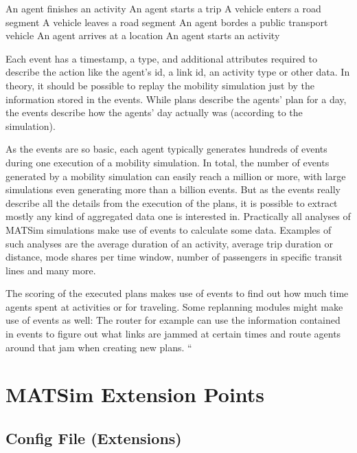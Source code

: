     An agent finishes an activity
    An agent starts a trip
    A vehicle enters a road segment
    A vehicle leaves a road segment
    An agent bordes a public transport vehicle
    An agent arrives at a location
    An agent starts an activity

Each event has a timestamp, a type, and additional attributes required to describe the action like the agent's id, a link id, an activity type or other data. In theory, it should be possible to replay the mobility simulation just by the information stored in the events. While plans describe the agents' plan for a day, the events describe how the agents' day actually was (according to the simulation).

As the events are so basic, each agent typically generates hundreds of events during one execution of a mobility simulation. In total, the number of events generated by a mobility simulation can easily reach a million or more, with large simulations even generating more than a billion events. But as the events really describe all the details from the execution of the plans, it is possible to extract mostly any kind of aggregated data one is interested in. Practically all analyses of MATSim simulations make use of events to calculate some data. Examples of such analyses are the average duration of an activity, average trip duration or distance, mode shares per time window, number of passengers in specific transit lines and many more.

The scoring of the executed plans makes use of events to find out how much time agents spent at activities or for traveling. Some replanning modules might make use of events as well: The router for example can use the information contained in events to figure out what links are jammed at certain times and route agents around that jam when creating new plans. 
``

\section{MATSim Extension Points}

\subsection{Config File (Extensions)}
\label{sec:config}


